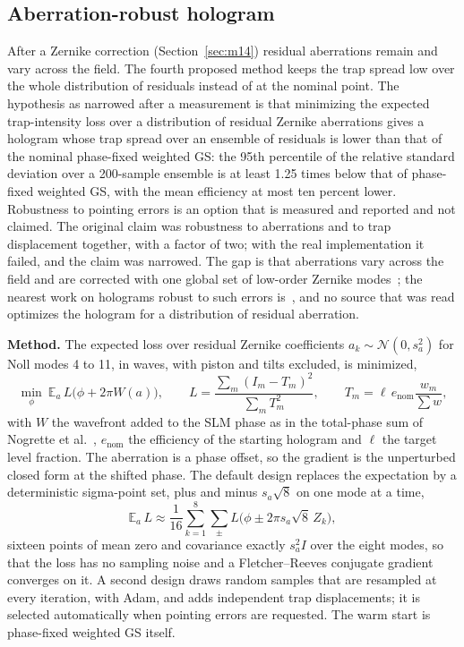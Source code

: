 \subsection{Aberration-robust hologram}\label{sec:b4}

After a Zernike correction (Section~\ref{sec:m14}) residual aberrations remain and vary across the field. The fourth proposed method keeps the trap spread low over the whole distribution of residuals instead of at the nominal point. The hypothesis as narrowed after a measurement is that minimizing the expected trap-intensity loss over a distribution of residual Zernike aberrations gives a hologram whose trap spread over an ensemble of residuals is lower than that of the nominal phase-fixed weighted GS: the 95th percentile of the relative standard deviation over a 200-sample ensemble is at least 1.25 times below that of phase-fixed weighted GS, with the mean efficiency at most ten percent lower. Robustness to pointing errors is an option that is measured and reported and not claimed. The original claim was robustness to aberrations and to trap displacement together, with a factor of two; with the real implementation it failed, and the claim was narrowed. The gap is that aberrations vary across the field and are corrected with one global set of low-order Zernike modes~\cite{ebadi2021}; the nearest work on holograms robust to such errors is~\cite{machu}, and no source that was read optimizes the hologram for a distribution of residual aberration.

\textbf{Method.} The expected loss over residual Zernike coefficients $a_k\sim\mathcal N(0,s_a^2)$ for Noll modes 4 to 11, in waves, with piston and tilts excluded, is minimized,
\begin{equation}
\min_\phi\ \mathbb E_{a}\,L\big(\phi+2\pi W(a)\big),\qquad L=\frac{\sum_m(I_m-T_m)^2}{\sum_mT_m^2},\qquad T_m=\ell\,e_{\mathrm{nom}}\frac{w_m}{\sum w},
\label{eq:b4}
\end{equation}
with $W$ the wavefront added to the SLM phase as in the total-phase sum of Nogrette et al.~\cite{nogrette}, $e_{\mathrm{nom}}$ the efficiency of the starting hologram and $\ell$ the target level fraction. The aberration is a phase offset, so the gradient is the unperturbed closed form at the shifted phase. The default design replaces the expectation by a deterministic sigma-point set, plus and minus $s_a\sqrt8$ on one mode at a time,
\begin{equation}
\mathbb E_a\,L\approx\frac1{16}\sum_{k=1}^{8}\sum_{\pm}L\big(\phi\pm2\pi s_a\sqrt8\,Z_k\big),
\label{eq:b4-sigma}
\end{equation}
sixteen points of mean zero and covariance exactly $s_a^2I$ over the eight modes, so that the loss has no sampling noise and a Fletcher--Reeves conjugate gradient converges on it. A second design draws random samples that are resampled at every iteration, with Adam, and adds independent trap displacements; it is selected automatically when pointing errors are requested. The warm start is phase-fixed weighted GS itself.

